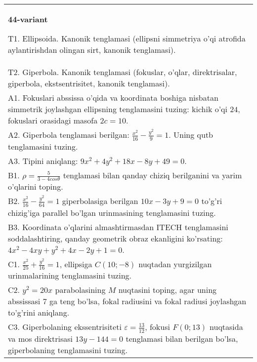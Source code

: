 \documentclass{article}
\begin{document}
\begin{tabular}{m{17cm}}
\textbf{44-variant}
\newline

T1. Ellipsoida. Kanonik tenglamasi (ellipsni simmetriya o'qi atrofida aylantirishdan olingan sirt, kanonik tenglamasi).\\

T2. Giperbola. Kanonik tenglamasi (fokuslar, o'qlar, direktrisalar, giperbola, ekstsentrisitet, kanonik tenglamasi).\\

A1. Fokuslari abssissa o'qida va koordinata boshiga nisbatan simmetrik joylashgan ellipsning tenglamasini tuzing: kichik o'qi $24$, fokuslari orasidagi masofa $2c=10$.\\

A2. Giperbola tenglamasi berilgan: $\frac{x^{2}}{16}-\frac{y^{2}}{9}=1$. Uning qutb tenglamasini tuzing.\\

A3. Tipini aniqlang: $9x^{2}+4y^{2}+18x-8y+49=0$.\\

B1. $\rho = \frac{5}{3 - 4cos\theta}$ tenglamasi bilan qanday chiziq berilganini va yarim o'qlarini toping.  \\

B2. $\frac{x^{2}}{16} - \frac{y^{2}}{64} = 1$ giperbolasiga berilgan $10x - 3y + 9 = 0$ to'g'ri chizig'iga parallel bo'lgan urinmasining tenglamasini tuzing.  \\

B3. Koordinata o'qlarini almashtirmasdan ITECH tenglamasini soddalashtiring, qanday geometrik obraz ekanligini ko'rsating: $4x^{2} - 4xy + y^{2} + 4x - 2y + 1 = 0$.  \\

C1. $\frac{x^{2}}{25} + \frac{y^{2}}{16} = 1$, ellipsiga $C(10; - 8)$ nuqtadan yurgizilgan urinmalarining tenglamasini tuzing.  \\

C2. $y^{2} = 20x$ parabolasining $M$ nuqtasini toping, agar uning abssissasi 7 ga teng bo'lsa, fokal radiusini va fokal radiusi joylashgan to'g'rini aniqlang.\\

C3. Giperbolaning ekssentrisiteti $\varepsilon = \frac{13}{12}$, fokusi $F(0;13)$ nuqtasida va mos direktrisasi $13y - 144 = 0$ tenglamasi bilan berilgan bo'lsa, giperbolaning tenglamasini tuzing.  \\

\end{tabular}
\vspace{1cm}
\end{document}
